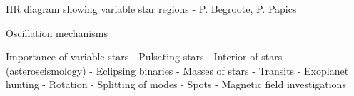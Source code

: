 HR diagram showing variable star regions - P. Begroote, P. Papics

Oscillation mechanisms







Importance of variable stars
    - Pulsating stars
        - Interior of stars (asteroseismology)
    - Eclipsing binaries
        - Masses of stars
    - Transits
        - Exoplanet hunting
    - Rotation
        - Splitting of modes
        - Spots
        - Magnetic field investigations


